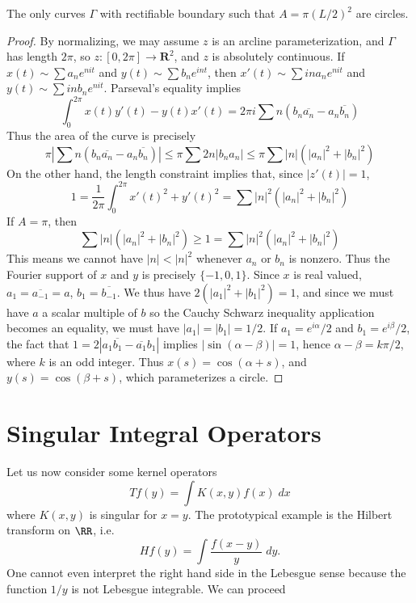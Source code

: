 \begin{theorem}
  The only curves $\Gamma$ with rectifiable boundary such that $A = \pi (L/2)^2$ are circles.
\end{theorem}
\begin{proof}
By normalizing, we may assume $z$ is an arcline parameterization, and $\Gamma$ has length $2\pi$, so $z:[0,2\pi] \to \mathbf{R}^2$, and $z$ is absolutely continuous. If $x(t) \sim \sum a_n e^{nit}$ and $y(t) \sim \sum b_n e^{int}$, then $x'(t) \sim \sum i n a_n e^{n i t}$ and $y(t) \sim \sum i n b_n e^{nit}$. Parseval's equality implies
%
\[ \int_0^{2\pi} x(t) y'(t) - y(t) x'(t) = 2 \pi i \sum n (b_n \overline{a_n} - a_n \overline{b_n}) \]
%
Thus the area of the curve is precisely
%
\[ \pi \left| \sum n (b_n \overline{a_n} - a_n \overline{b_n}) \right| \leq \pi \sum 2n|b_na_n| \leq \pi \sum |n|(|a_n|^2 + |b_n|^2) \]
%
On the other hand, the length constraint implies that, since $|z'(t)| = 1$,
%
\[ 1 = \frac{1}{2\pi} \int_0^{2\pi} x'(t)^2 + y'(t)^2 = \sum |n|^2(|a_n|^2 + |b_n|^2) \]
%
If $A = \pi$, then
%
\[ \sum |n| (|a_n|^2 + |b_n|^2) \geq 1 = \sum |n|^2 (|a_n|^2 + |b_n|^2) \]
%
This means we cannot have $|n| < |n|^2$ whenever $a_n$ or $b_n$ is nonzero. Thus the Fourier support of $x$ and $y$ is precisely $\{ -1, 0, 1 \}$. Since $x$ is real valued, $a_1 = \overline{a_{-1}} = a$, $b_1 = \overline{b_{-1}}$. We thus have $2(|a_1|^2 + |b_1|^2) = 1$, and since we must have $a$ a scalar multiple of $b$ so the Cauchy Schwarz inequality application becomes an equality, we must have $|a_1| = |b_1| = 1/2$. If $a_1 = e^{i\alpha}/2$ and $b_1 = e^{i\beta}/2$, the fact that $1 = 2|a_1\overline{b_1} - \overline{a_1}b_1|$ implies $|\sin(\alpha - \beta)| = 1$, hence $\alpha - \beta = k \pi /2$, where $k$ is an odd integer. Thus $x(s) = \cos(\alpha + s)$, and $y(s) = \cos(\beta + s)$, which parameterizes a circle.
\end{proof}




\chapter{Singular Integral Operators}

Let us now consider some kernel operators
%
\[ Tf(y) = \int K(x,y) f(x)\; dx \]
%
where $K(x,y)$ is singular for $x = y$. The prototypical example is the Hilbert transform on $\RR$, i.e.
%
\[ Hf(y) = \int \frac{f(x-y)}{y}\; dy. \]
%
One cannot even interpret the right hand side in the Lebesgue sense because the function $1/y$ is not Lebesgue integrable. We can proceed  





